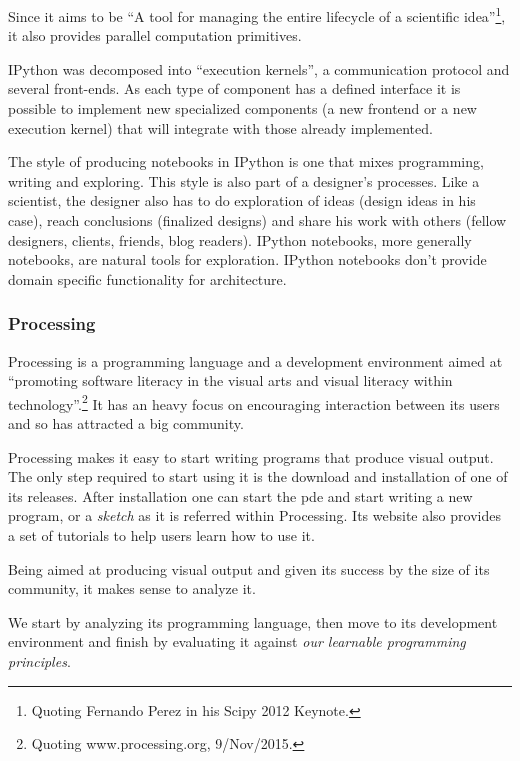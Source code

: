 \documentclass{./llncs2e/llncs}
\begin{document}
	Since it aims to be ``A tool for managing the entire lifecycle of a scientific idea''\footnote{Quoting Fernando Perez in his Scipy 2012 Keynote.}, it also provides parallel computation primitives.
	
	IPython was decomposed into ``execution kernels'', a communication protocol and several front-ends. 
	As each type of component has a defined interface it is possible to implement new specialized components (a new frontend or a new execution kernel) that will integrate with those already implemented.
	
	The style of producing notebooks in IPython is one that mixes programming, writing and exploring. 
	This style is also part of a designer's processes. 
	Like a scientist, the designer also has to do exploration of ideas (design ideas in his case), reach conclusions (finalized designs) and share his work with others (fellow designers, clients, friends, blog readers). 
	IPython notebooks, more generally notebooks, are natural tools for exploration.
	IPython notebooks don't provide domain specific functionality for architecture.
	
\subsubsection{Processing\cite{reas2007processing}}
	Processing is a programming language and a development environment aimed at ``promoting software literacy in the visual arts and visual literacy within technology''.\footnote{Quoting www.processing.org, 9/Nov/2015.}
	It has an heavy focus on encouraging interaction between its users and so has attracted a big community.
	
	Processing makes it easy to start writing programs that produce visual output. 
	The only step required to start using it is the download and installation of one of its releases. 
	After installation one can start the \ac{pde} and start writing a new program, or a \emph{sketch} as it is referred within Processing. 
	Its website also provides a set of tutorials to help users learn how to use it.
	
	Being aimed at producing visual output and given its success by the size of its community, it makes sense to analyze it.
	
	We start by analyzing its programming language, then move to its development environment and finish by evaluating it against \emph{our learnable programming principles}.
	
\end{document}
